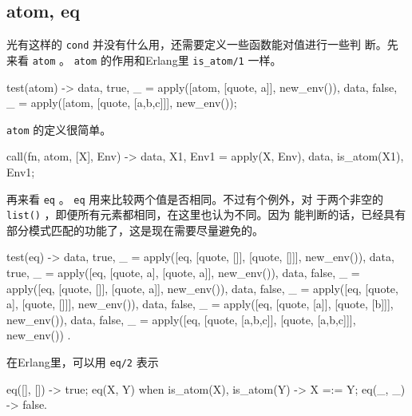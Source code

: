 \documentclass[preview,multi,crop=false,border=1in,class=memoir]{standalone}
\begin{document}
\begin{preview-page}
\subsection{atom, eq}

光有这样的 \verb|cond| 并没有什么用，还需要定义一些函数能对值进行一些判
断。先来看 \verb|atom| 。 \verb|atom| 的作用和Erlang里
\verb|is_atom/1| 一样。


\begin{SourceCode}
test(atom) ->
    {{data, true}, _} =
        apply([atom, [quote, a]], new_env()),
    {{data, false}, _} =
        apply([atom, [quote, [a,b,c]]], new_env());
\end{SourceCode}

\verb|atom| 的定义很简单。

\begin{SourceCode}
call({fn, atom}, [X], Env) ->
    {{data, X1}, Env1} = apply(X, Env),
    {{data, is_atom(X1)}, Env1};
\end{SourceCode}

再来看 \verb|eq| 。 \verb|eq| 用来比较两个值是否相同。不过有个例外，对
于两个非空的 \verb|list()| ，即便所有元素都相同，在这里也认为不同。因为
能判断的话，已经具有部分模式匹配的功能了，这是现在需要尽量避免的。

\begin{SourceCode}
test(eq) ->
    {{data, true}, _} =
        apply([eq, [quote, []], [quote, []]],
              new_env()),
    {{data, true}, _} =
        apply([eq, [quote, a], [quote, a]],
              new_env()),
    {{data, false}, _} =
        apply([eq, [quote, []], [quote, a]],
              new_env()),
    {{data, false}, _} =
        apply([eq, [quote, a], [quote, []]],
              new_env()),
    {{data, false}, _} =
        apply([eq, [quote, [a]], [quote, [b]]],
              new_env()),
    {{data, false}, _} =
        apply([eq, [quote, [a,b,c]], [quote, [a,b,c]]],
              new_env())
.
\end{SourceCode}

在Erlang里，可以用 \verb|eq/2| 表示

\begin{SourceCode}
eq([], []) ->
    true;
eq(X, Y)
  when is_atom(X), is_atom(Y) ->
    X =:= Y;
eq(_, _) ->
    false.
\end{SourceCode}



\end{preview-page}
\end{document}
